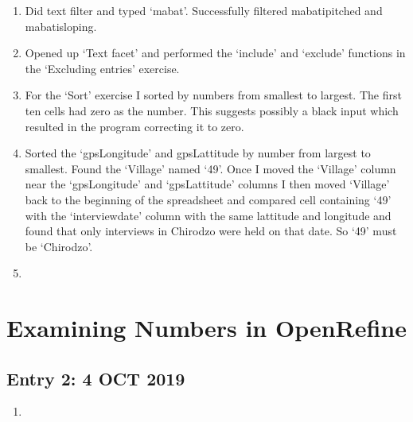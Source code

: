 \documentclass{article}
\begin{document}
\begin{enumerate}
    \item Did text filter and typed `mabat'. Successfully filtered mabatipitched and mabatisloping.
    \item Opened up `Text facet' and performed the `include' and `exclude' functions in the `Excluding entries' exercise.
    \item For the `Sort' exercise I sorted by numbers from smallest to largest. The first ten cells had zero as the number. This suggests possibly a black input which resulted in the program correcting it to zero.
    \item Sorted the `gps\textunderscore Longitude' and gps\textunderscore Lattitude by number from largest to smallest. Found the `Village' named `49'. Once I moved the `Village' column near the `gps\textunderscore Longitude' and `gps\textunderscore Lattitude' columns I then moved `Village' back to the beginning of the spreadsheet and compared cell containing `49' with the `interview\textunderscore date' column with the same lattitude and longitude and found that only interviews in Chirodzo were held on that date. So `49' must be `Chirodzo'.
    \item 
\end{enumerate}

\section{Examining Numbers in OpenRefine}

\subsection{Entry 2: 4 OCT 2019}

\begin{enumerate}
    \item 
\end{enumerate}
\end{document}
